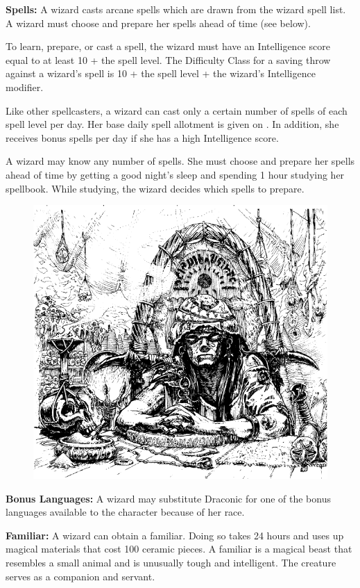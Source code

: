 \textbf{Spells:} A wizard casts arcane spells which are drawn from the wizard spell list. A wizard must choose and prepare her spells ahead of time (see below).

To learn, prepare, or cast a spell, the wizard must have an Intelligence score equal to at least 10 + the spell level. The Difficulty Class for a saving throw against a wizard's spell is 10 + the spell level + the wizard's Intelligence modifier.

Like other spellcasters, a wizard can cast only a certain number of spells of each spell level per day. Her base daily spell allotment is given on . In addition, she receives bonus spells per day if she has a high Intelligence score.

A wizard may know any number of spells. She must choose and prepare her spells ahead of time by getting a good night's sleep and spending 1 hour studying her spellbook. While studying, the wizard decides which spells to prepare.

\begin{figure}[b!]
\centering
\includegraphics[width=\textwidth-2cm]{images/wizard-5.png}
\WOTC
\end{figure}

\textbf{Bonus Languages:} A wizard may substitute Draconic for one of the bonus languages available to the character because of her race.

\textbf{Familiar:} A wizard can obtain a familiar. Doing so takes 24 hours and uses up magical materials that cost 100 ceramic pieces. A familiar is a magical beast that resembles a small animal and is unusually tough and intelligent. The creature serves as a companion and servant.

